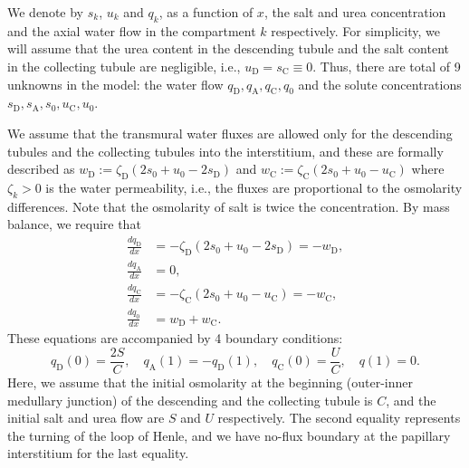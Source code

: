 \documentclass{article}
\numberwithin{equation}{section} %
\begin{document}
We denote by $s_k$, $u_k$ and $q_k$, as a function of $x$, the salt and urea concentration and the axial water flow in the compartment $k$ respectively.
For simplicity, we will assume that the urea content in the descending tubule and the salt content in the collecting tubule are negligible, i.e., $u_\mathrm{D}=s_\mathrm{C}\equiv 0$.
Thus, there are total of 9 unknowns in the model: the water flow $q_\mathrm{D},q_\mathrm{A},q_\mathrm{C},q_0$ and the solute concentrations $s_\mathrm{D},s_\mathrm{A},s_0,u_\mathrm{C},u_0$.

We assume that the transmural water fluxes are allowed only for the descending tubules and the collecting tubules into the interstitium, and these are formally described as $w_\mathrm{D}:=\zeta_\mathrm{D}(2s_0+u_0-2s_\mathrm{D})$ and $w_\mathrm{C}:=\zeta_\mathrm{C}(2s_0+u_0 - u_\mathrm{C})$ where $\zeta_k>0$ is the water permeability, i.e., the fluxes are proportional to the osmolarity differences.
Note that the osmolarity of salt is twice the concentration.
By mass balance, we require that
\begin{align}
    \frac{dq_\mathrm{D}}{dx} &= -\zeta_\mathrm{D}\left( 2s_0+u_0 - 2s_\mathrm{D} \right) = -w_\mathrm{D},\label{eq:q_D_eq}\\
    \frac{dq_\mathrm{A}}{dx} &= 0,\label{eq:q_A_eq}\\
    \frac{dq_\mathrm{C}}{dx} &= -\zeta_\mathrm{C}\left( 2s_0+u_0 - u_\mathrm{C} \right) = -w_\mathrm{C},\label{eq:q_C_eq}\\
    \frac{dq_0}{dx} &= w_\mathrm{D}+w_\mathrm{C}.\label{eq:q_0_eq}
\end{align}
These equations are accompanied by 4 boundary conditions:
\begin{equation}\label{eq:q_bdry}
    q_\mathrm{D}(0) = \frac{2S}{C},\quad q_\mathrm{A}(1) = -q_\mathrm{D}(1),\quad q_\mathrm{C}(0) = \frac{U}{C},\quad q(1) = 0.
\end{equation}
Here, we assume that the initial osmolarity at the beginning (outer-inner medullary junction) of the descending and the collecting tubule is $C$, and the initial salt and urea flow are $S$ and $U$ respectively.
The second equality represents the turning of the loop of Henle, and we have no-flux boundary at the papillary interstitium for the last equality.
\end{document}
